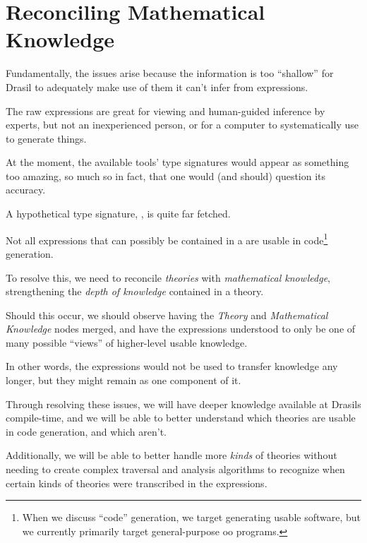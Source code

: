 \section{Reconciling Mathematical Knowledge}

Fundamentally, the issues arise because the information is too ``shallow'' for
Drasil to adequately make use of them \textemdash{} it can't infer from
expressions.

The raw expressions are great for viewing and human-guided inference by experts,
but not an inexperienced person, or for a computer to systematically use to
generate things.

At the moment, the available tools' type signatures would appear as something
too amazing, so much so in fact, that one would (and should) question its
accuracy.

A hypothetical type signature, , is quite far
fetched.

Not all expressions that can possibly be contained in a \RelationConcept{} are
usable in code\footnote{When we discuss ``code'' generation, we target
generating usable software, but we currently primarily target general-purpose
\acs{oo} programs.} generation.










To resolve this, we need to reconcile \textit{theories} with
\textit{mathematical knowledge}, strengthening the \textit{depth of knowledge}
contained in a theory.

Should this occur, we should observe  having the
\textit{Theory} and \textit{Mathematical Knowledge} nodes merged, and have the
expressions understood to only be one of many possible ``views'' of higher-level
usable knowledge.

In other words, the expressions would not be used to transfer knowledge any
longer, but they might remain as one component of it.

Through resolving these issues, we will have deeper knowledge available at
Drasils compile-time, and we will be able to better understand which theories
are usable in code generation, and which aren't.

Additionally, we will be able to better handle more \textit{kinds} of theories
without needing to create complex traversal and analysis algorithms to recognize
when certain kinds of theories were transcribed in the expressions.











